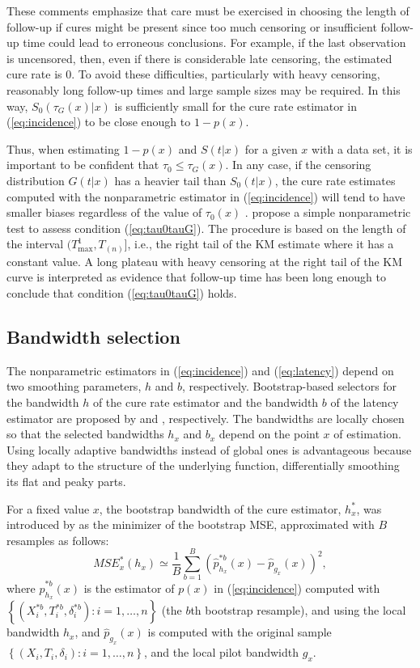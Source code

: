 These comments emphasize that care must be exercised in choosing the length of follow-up if cures might be present since too much censoring or insufficient follow-up time could lead to erroneous conclusions. For example, if the last observation is uncensored, then, even if there is considerable late censoring, the estimated cure rate is 0. To avoid these difficulties, particularly with heavy censoring, reasonably long follow-up times and large sample sizes may be required. In this way, $S_0\left(\tau_G (x) |x \right)$ is sufficiently small for the cure rate estimator in (\ref{eq:incidence}) to be close enough to $1-p(x)$.

Thus, when estimating $1-p(x)$ and $S\left (t|x \right)$ for a given $x$ with a data set, it is important to be confident that $\tau_0 \leq \tau_G (x)$. In any case, if the censoring distribution $G(t|x)$ has a heavier tail than $S_0\left (t|x \right)$, the cure rate estimates computed with the nonparametric estimator in (\ref{eq:incidence}) will tend to have smaller biases regardless of the value of $\tau_0(x)$ \citep[see][]{Xu}. \cite{Maller1} propose a simple nonparametric test to assess condition (\ref{eq:tau0tauG}). The procedure is based on the length of the interval $(T^1_{\max},T_{(n)}]$, i.e., the right tail of the KM estimate where it has a constant value. A long plateau with heavy censoring at the right tail of the KM curve is interpreted as evidence that follow-up time has been long enough to conclude that condition (\ref{eq:tau0tauG}) holds.

\subsection{Bandwidth selection}
\label{sec:bandwidth}

The nonparametric estimators in (\ref{eq:incidence}) and (\ref{eq:latency}) depend on two smoothing parameters, $h$ and $b$, respectively. Bootstrap-based selectors for the bandwidth $h$ of the cure rate estimator and the bandwidth $b$ of the latency estimator are proposed by \cite{Lopez1} and \cite{Lopez2}, respectively. The bandwidths are locally chosen so that the selected bandwidths $h_x$ and $b_x$ depend on the point $x$ of estimation. Using locally adaptive bandwidths instead of global ones is advantageous because they adapt to the structure of the underlying function, differentially smoothing its flat and peaky parts.

For a fixed value $x$, the bootstrap bandwidth of the cure estimator, $h_x^*$, was introduced by \cite{Lopez1} as the minimizer of the bootstrap MSE, approximated with $B$ resamples as follows:
\begin{equation} \label{MSE_boot}
MSE_{x}^*(h_x) \simeq \frac{1}{B} \sum_{b=1}^B \left(\hat p_{h_x}^{*b}(x)- \hat p_{g_x}(x) \right)^2,
\end{equation}
where $\hat p_{h_x}^{*b}(x)$ is the estimator of $p(x)$ in (\ref{eq:incidence}) computed with $\left \{\left(X_i^{\ast b},T_i^{\ast b},\delta_i^{\ast b} \right): i=1,\ldots,n\right \}$ (the $b$th bootstrap resample), and using the local bandwidth $h_x$, and $\hat{p}_{g_x}(x)$ is computed with the original sample $\left \{\left(X_i,T_i,\delta_i \right): i=1,\ldots,n\right \}$, and the local pilot bandwidth $g_x$.

